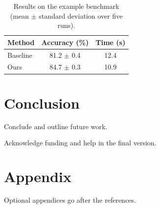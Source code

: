 \documentclass[sigconf,review,anonymous]{acmart}
\begin{document}
\begin{table}[!htb]
  \caption{Results on the example benchmark (mean $\pm$ standard deviation over five runs).}
  \label{tab:results}
  \centering
  \begin{tabular}{lcc}
    \toprule
    Method   & Accuracy (\%)  & Time (s) \\
    \midrule
    Baseline & 81.2 $\pm$ 0.4 & 12.4     \\
    Ours     & 84.7 $\pm$ 0.3 & 10.9     \\
    \bottomrule
  \end{tabular}
\end{table}

\section{Conclusion}
Conclude and outline future work.

\begin{acks}
Acknowledge funding and help in the final version.
\end{acks}



\appendix

\section{Appendix}
Optional appendices go after the references.
\end{document}

